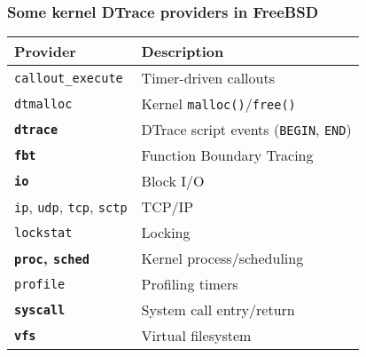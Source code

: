 \begin{frame}
  \frametitle{Some kernel DTrace providers in FreeBSD}

  \begin{center}
  \begin{small}
  \begin{tabular}{ll}
    \hline
      \textbf{Provider} & \textbf{Description} \\
    \hline
      \texttt{callout\_execute} & Timer-driven callouts \\
      \texttt{dtmalloc} & Kernel \texttt{malloc()}/\texttt{free()} \\
      \textbf{\texttt{dtrace}} & DTrace script events (\texttt{BEGIN},
	\texttt{END}) \\
      \textbf{\texttt{fbt}} & Function Boundary Tracing \\
      \textbf{\texttt{io}} & Block I/O \\
      \texttt{ip}, \texttt{udp}, \texttt{tcp}, \texttt{sctp}  & TCP/IP \\
      \texttt{lockstat} & Locking \\
      \textbf{\texttt{proc}, \texttt{sched}} & Kernel process/scheduling \\
      \texttt{profile} & Profiling timers \\
      \textbf{\texttt{syscall}} & System call entry/return \\
      \textbf{\texttt{vfs}} & Virtual filesystem \\
    \hline
  \end{tabular}
  \end{small}
  \end{center}
\end{frame}

